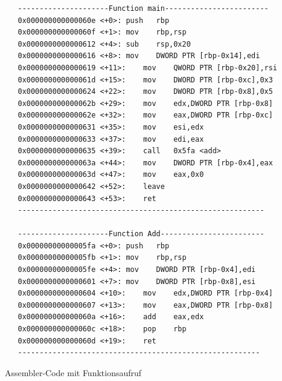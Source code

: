 \documentclass[12pt]{article}
\begin{document}
\begin{code}[!htb]
\begin{lstlisting}
   ---------------------Function main------------------------
   0x000000000000060e <+0>:	push   rbp
   0x000000000000060f <+1>:	mov    rbp,rsp
   0x0000000000000612 <+4>:	sub    rsp,0x20
   0x0000000000000616 <+8>:	mov    DWORD PTR [rbp-0x14],edi
   0x0000000000000619 <+11>:	mov    QWORD PTR [rbp-0x20],rsi
   0x000000000000061d <+15>:	mov    DWORD PTR [rbp-0xc],0x3
   0x0000000000000624 <+22>:	mov    DWORD PTR [rbp-0x8],0x5
   0x000000000000062b <+29>:	mov    edx,DWORD PTR [rbp-0x8]
   0x000000000000062e <+32>:	mov    eax,DWORD PTR [rbp-0xc]
   0x0000000000000631 <+35>:	mov    esi,edx
   0x0000000000000633 <+37>:	mov    edi,eax
   0x0000000000000635 <+39>:	call   0x5fa <add>
   0x000000000000063a <+44>:	mov    DWORD PTR [rbp-0x4],eax
   0x000000000000063d <+47>:	mov    eax,0x0
   0x0000000000000642 <+52>:	leave  
   0x0000000000000643 <+53>:	ret   
   ---------------------------------------------------------
   
   ---------------------Function Add------------------------
   0x00000000000005fa <+0>:	push   rbp
   0x00000000000005fb <+1>:	mov    rbp,rsp
   0x00000000000005fe <+4>:	mov    DWORD PTR [rbp-0x4],edi
   0x0000000000000601 <+7>:	mov    DWORD PTR [rbp-0x8],esi
   0x0000000000000604 <+10>:	mov    edx,DWORD PTR [rbp-0x4]
   0x0000000000000607 <+13>:	mov    eax,DWORD PTR [rbp-0x8]
   0x000000000000060a <+16>:	add    eax,edx
   0x000000000000060c <+18>:	pop    rbp
   0x000000000000060d <+19>:	ret    
   --------------------------------------------------------
\end{lstlisting}
\caption[Assembler Code Funktionen]{Assembler-Code mit Funktionsaufruf}
\label{code:funktionasm}
\end{code}
\end{document}
